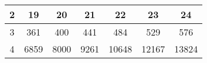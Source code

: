 \documentclass[review,12pt]{elsarticle}
\begin{document}
\begin{table}[htbp!]
\begin{tabular}{ccccccc}
\multicolumn{1}{|c|}{2}  & \multicolumn{1}{c|}{19}    & \multicolumn{1}{c|}{20}                       & \multicolumn{1}{c|}{21}                       & \multicolumn{1}{c|}{22}                       & \multicolumn{1}{c|}{23}                       & \multicolumn{1}{c|}{24}    \\ \hline
\multicolumn{1}{|c|}{3}  & \multicolumn{1}{c|}{361}   & \multicolumn{1}{c|}{400}                      & \multicolumn{1}{c|}{441}                      & \multicolumn{1}{c|}{484}                      & \multicolumn{1}{c|}{529}                      & \multicolumn{1}{c|}{576}   \\ \hline
\multicolumn{1}{|c|}{4}  & \multicolumn{1}{c|}{6859}  & \multicolumn{1}{c|}{8000}                     & \multicolumn{1}{c|}{9261}                     & \multicolumn{1}{c|}{10648}                    & \multicolumn{1}{c|}{12167}                    & \multicolumn{1}{c|}{13824} \\ \hline
\end{tabular}
\end{table}
\end{document}
